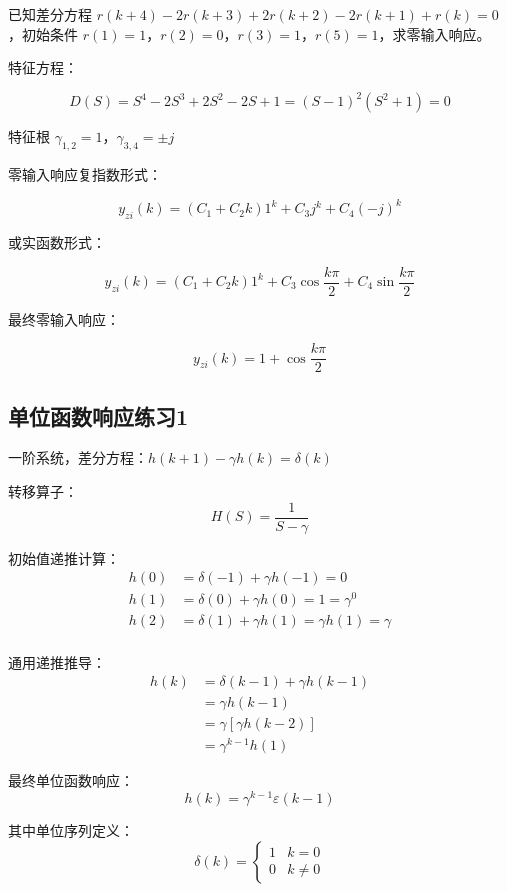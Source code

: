 \documentclass[UTF8]{ctexart}
\begin{document}
\begin{problem}
已知差分方程 $r(k+4)-2r(k+3)+2r(k+2)-2r(k+1)+r(k)=0$，初始条件 $r(1)=1$，$r(2)=0$，$r(3)=1$，$r(5)=1$，求零输入响应。
\end{problem}

\begin{solution}
特征方程：

$$
D(S)=S^{4}-2S^{3}+2S^{2}-2S+1=(S-1)^{2}\left(S^{2}+1\right)=0
$$

特征根 $\gamma_{1,2}=1$，$\gamma_{3,4}=\pm j$

零输入响应复指数形式：

$$
y_{zi}(k)=\left(C_{1}+C_{2}k\right)1^{k}+C_{3}j^{k}+C_{4}(-j)^{k}
$$


或实函数形式：

$$
y_{zi}(k)=\left(C_{1}+C_{2}k\right)1^{k}+C_{3}\cos\frac{k\pi}{2}+C_{4}\sin\frac{k\pi}{2}
$$


最终零输入响应：

$$
y_{zi}(k)=1+\cos\frac{k\pi}{2}
$$
\end{solution}

\subsection{单位函数响应练习1}

\begin{problem}
一阶系统，差分方程：$h(k+1)-\gamma h(k)=\delta(k)$
\end{problem}

\begin{solution}
转移算子：
$$
H(S)=\frac{1}{S-\gamma}
$$

初始值递推计算：
$$
\begin{aligned}
h(0)&=\delta(-1)+\gamma h(-1)=0 \\
h(1)&=\delta(0)+\gamma h(0)=1=\gamma^{0} \\
h(2)&=\delta(1)+\gamma h(1)=\gamma h(1)=\gamma \\
\end{aligned}
$$

通用递推推导：
$$
\begin{aligned}
h(k) & =\delta(k-1)+\gamma h(k-1) \\
& =\gamma h(k-1) \\
& =\gamma\left[\gamma h(k-2)\right] \\
& =\gamma^{k-1} h(1)
\end{aligned}
$$

最终单位函数响应：
$$
h(k)=\gamma^{k-1} \varepsilon(k-1)
$$

其中单位序列定义：
$$\delta(k)=
\begin{cases}
1 & k=0 \\
0 & k \neq 0
\end{cases}$$
\end{solution}
\end{document}
